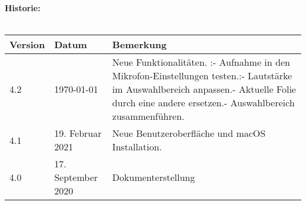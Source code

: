 \textbf{Historie:}
\\\\
\makeatletter
\begin{tabularx}{\textwidth}{llX} \toprule
	\textbf{Version}	& \textbf{Datum}		& \textbf{Bemerkung}		\\ \midrule
	4.2					& \today				& Neue Funktionalitäten. \newline\newline \lectPresenter:\newline - Aufnahme in den Mikrofon-Einstellungen testen.\newline\newline \lectEditor:\newline - Lautstärke im Auswahlbereich anpassen.\newline - Aktuelle Folie durch eine andere ersetzen.\newline - Auswahlbereich zusammenführen.	\\
	4.1					& 19. Februar 2021		& Neue Benutzeroberfläche und macOS Installation.	\\
	4.0					& 17. September 2020	& Dokumenterstellung		\\ \bottomrule
	\hline
\end{tabularx}
\makeatother